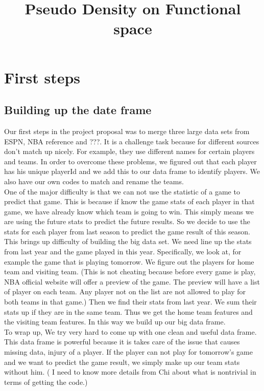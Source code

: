 \documentclass[11pt]{article}
\begin{document}
\title{Pseudo Density on Functional space}
\maketitle
\section{First steps}
\subsection{Building up the date frame}
Our first steps in the project proposal was to merge three large data sets from ESPN, NBA reference and ???.
 It is a challenge task  because for different sources
don't match up nicely. For example, they use different names for certain players and teams. In order to overcome these problems, we 
figured out that each player has his unique playerId and we add this to our data frame to identify players.
We also have our own codes to match and rename the teams. \\
One of the major difficulty is that we can not use the statistic of a game to predict that game. This is because if 
know the game stats of each player in that game, we have already know which team is going to win.
This simply means we are using the future stats to predict the future results. So we decide to use the stats for each player from last 
season to predict the game result of this season.\\
This brings up difficulty of building the big data set. We need line up the stats from last year and the game played in this year.
Specifically, we look at, for example the game that is playing tomorrow. We figure out the players for home team and visiting team. 
(This is not cheating because before every game is play, NBA official website will offer a preview of the game. The preview will 
have a list of player on each team. Any player not on the list are not allowed to play for both teams in that game.)
Then we find their stats from last year. We sum their stats up if they are in the same team. Thus we get the home team features and the visiting team
features. In this way we build up our big data frame. \\
To wrap up, 
We try very hard to come up with one clean and useful data frame. This data frame is powerful because it is takes care of the issue that causes missing data, injury of a player.
If the player can not play for tomorrow's game and we want to predict the game result, we simply make up our team stats without him.
( I need to know more details from Chi about what is nontrivial in terms of getting the code.)
\end{document}
